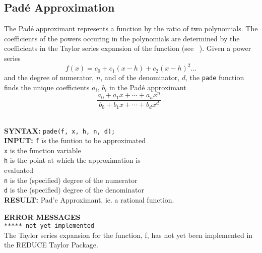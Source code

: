 \subsection{Pad\'{e} Approximation}

The Pad\'{e} approximant represents a function by the ratio of two 
polynomials. The coefficients of the powers occuring in the polynomials 
are determined by the coefficients in the Taylor series
expansion of the function (see ~\cite{PA}). Given a power series
\[ f(x) = c_0 + c_1 (x-h) + c_2 (x-h)^2 \ldots \]
and the degree of numerator, $n$, and of the denominator, $d$,
the \texttt{pade} function finds the unique coefficients 
$a_i,\, b_i$ in the Pad\'{e} approximant 
\[ \frac{a_0+a_1 x+ \cdots + a_n x^n}{b_0+b_1 x+ \cdots + b_d x^d} \; .\]
\\[\baselineskip]

\hypertarget{PADE:operator}{}
\begin{tabbing}
\textbf{SYNTAX:} \hspace{5mm}\= \texttt{pade(f, x, h, n, d);}\\[\baselineskip]

\textbf{INPUT:}
\> \texttt{f} \hspace{3mm} \= is the funtion to be approximated\\
\> \texttt{x}             \> is the function variable\\
\> \texttt{h}             \> is the point at which the approximation is\\ 
\>                     \> evaluated\\
\> \texttt{n}             \> is the (specified) degree of the numerator\\
\> \texttt{d}             \> is the (specified) degree of the denominator\\[\baselineskip]


\textbf{RESULT:} 
\> Pad\a'{e} Approximant, ie. a rational function.\\[\baselineskip]
\end{tabbing}


\textbf{ERROR MESSAGES}\\

\texttt{***** not yet implemented}\\

The Taylor series expansion for the function, f, has not yet
been implemented in the {\small REDUCE} Taylor Package.\\[\baselineskip]


